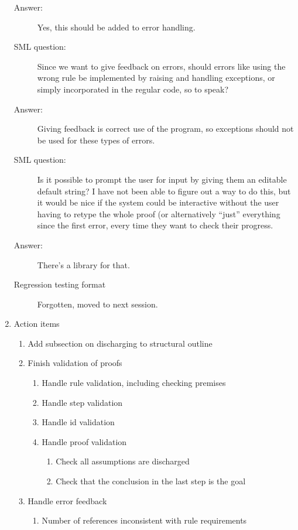 \documentclass[a4paper]{article}
\begin{document}
\begin{enumerate}
\begin{description}
      \item[Answer:] Yes, this should be added to error handling.
      \item[SML question:] Since we want to give feedback on errors, should
      errors like using the wrong rule be implemented by raising and 
      handling exceptions, or simply incorporated in the regular code, so
      to speak?
      \item[Answer:] Giving feedback is correct use of the program, so
      exceptions should not be used for these types of errors.
      \item[SML question:] Is it possible to prompt the user for input by
      giving them an editable default string? I have not been able to figure
      out a way to do this, but it would be nice if the system could be 
      interactive without the user having to retype the whole proof (or
      alternatively ``just'' everything since the first error, every time
      they want to check their progress.
      \item[Answer:] There's a library for that.
      \item[Regression testing format] Forgotten, moved to next session.
    \end{description}
  \item Action items
    \begin{enumerate}[\HollowBox]
      \item Add subsection on discharging to structural outline
      \item Finish validation of proofs
        \begin{enumerate}[\HollowBox]
          \item Handle rule validation, including checking premises
          \item Handle step validation
          \item Handle id validation
          \item Handle proof validation
            \begin{enumerate}[\HollowBox]
              \item Check all assumptions are discharged
              \item Check that the conclusion in the last step is the goal
            \end{enumerate}
        \end{enumerate}
      \item Handle error feedback
        \begin{enumerate}[\HollowBox]
          \item Number of references inconsistent with rule requirements

\end{enumerate}
\end{enumerate}
\end{enumerate}
\end{document}
